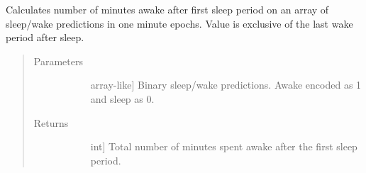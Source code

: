 \documentclass[letterpaper,10pt,english]{sphinxmanual}
\begin{document}
\begin{fulllineitems}
\label{\detokenize{index:sleeppy.utils.wake_after_sleep_onset}}
Calculates number of minutes awake after first sleep period on an array of sleep/wake predictions in one minute
epochs. Value is exclusive of the last wake period after sleep.
\begin{quote}\begin{description}
\item[{Parameters}] \leavevmode\begin{description}
\item[{}] \leavevmode{[}array-like{]}
Binary sleep/wake predictions. Awake encoded as 1 and sleep as 0.

\end{description}

\item[{Returns}] \leavevmode\begin{description}
\item[{}] \leavevmode{[}int{]}
Total number of minutes spent awake after the first sleep period.

\end{description}

\end{description}\end{quote}

\end{fulllineitems}



\renewcommand{\indexname}{Python Module Index}
\begin{sphinxtheindex}
\let\bigletter\sphinxstyleindexlettergroup
\bigletter{s}
\item\relax{}
\item\relax{}
\item\relax{}
\item\relax{}
\end{sphinxtheindex}

\renewcommand{\indexname}{Index}
\printindex
\end{document}
